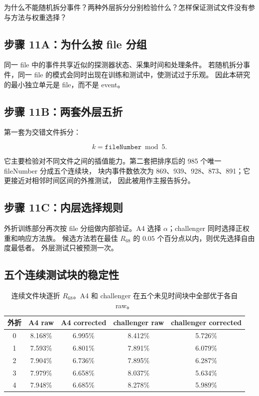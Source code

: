\documentclass[UTF8,12pt,a4paper,oneside,fontset=none]{ctexart}
\numberwithin{equation}{section}
\newcommand{\Rsixtyeight}{R_{68}}
\begin{document}
\begin{questionbox}
为什么不能随机拆分事件？两种外层拆分分别检验什么？怎样保证测试文件没有参与方法与权重选择？
\end{questionbox}

\subsection{步骤 11A：为什么按 file 分组}

同一 file 中的事件共享近似的探测器状态、采集时间和处理条件。
若随机拆分事件，同一 file 的模式会同时出现在训练和测试中，使测试过于乐观。
因此本研究的最小独立单元是 file，而不是 event。

\subsection{步骤 11B：两套外层五折}

第一套为交错文件拆分：

\begin{equation}
k=\texttt{fileNumber}\bmod5.
\label{eq:file-mod-fold}
\end{equation}

它主要检验对不同文件之间的插值能力。第二套把排序后的 985 个唯一 fileNumber 分成五个连续块，
块内事件数依次为 869、939、928、873、891；它更接近对相邻时间区间的外推测试，
因此被用作主报告拆分。

\subsection{步骤 11C：内层选择规则}

外折训练部分再次按 file 分组做内部验证。A4 选择 \(\alpha\)；challenger 同时选择正权重和响应方法族。
候选方法若在最佳 \(\Rsixtyeight\) 的 \(0.05\) 个百分点以内，则优先选择自由度最低者。
外层测试只被预测一次。

\subsection{五个连续测试块的稳定性}

\begin{table}[H]
\centering
\caption{连续文件块逐折 \(\Rsixtyeight\)。A4 和 challenger 在五个未见时间块中全部优于各自 raw。}
\label{tab:fold-results}
\begin{tabular}{c cc cc}
\toprule
外折 & A4 raw & A4 corrected & challenger raw & challenger corrected \\
\midrule
0 & 8.168\% & 6.995\% & 8.412\% & 5.726\% \\
1 & 7.593\% & 6.801\% & 7.891\% & 6.079\% \\
2 & 7.904\% & 6.736\% & 7.895\% & 6.287\% \\
3 & 7.979\% & 6.658\% & 8.037\% & 5.634\% \\
4 & 7.948\% & 6.685\% & 8.278\% & 5.989\% \\
\bottomrule
\end{tabular}
\end{table}
\end{document}
